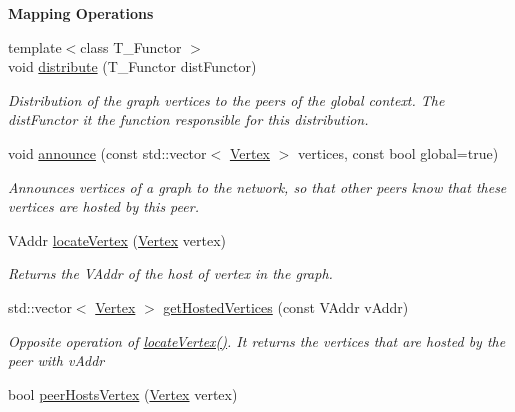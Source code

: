 \begin{Indent}{\bf Mapping Operations}\par
\begin{DoxyCompactItemize}
\item 
{\footnotesize template$<$class T\+\_\+\+Functor $>$ }\\void \hyperlink{structgraybat_1_1Cage_afeddcc035e25382462c38c77b481304d}{distribute} (T\+\_\+\+Functor dist\+Functor)
\begin{DoxyCompactList}\small\item\em Distribution of the graph vertices to the peers of the global context. The dist\+Functor it the function responsible for this distribution. \end{DoxyCompactList}\item 
void \hyperlink{structgraybat_1_1Cage_a8888227acfa41b0a9127a607ca16d32d}{announce} (const std\+::vector$<$ \hyperlink{structgraybat_1_1CommunicationVertex}{Vertex} $>$ vertices, const bool global=true)
\begin{DoxyCompactList}\small\item\em Announces {\itshape vertices} of a {\itshape graph} to the network, so that other peers know that these {\itshape vertices} are hosted by this peer. \end{DoxyCompactList}\item 
V\+Addr \hyperlink{structgraybat_1_1Cage_aefc3bddf2aa1ebbc363a35a35be8fb38}{locate\+Vertex} (\hyperlink{structgraybat_1_1CommunicationVertex}{Vertex} vertex)
\begin{DoxyCompactList}\small\item\em Returns the V\+Addr of the host of {\itshape vertex} in the graph. \end{DoxyCompactList}\item 
\hypertarget{structgraybat_1_1Cage_ad135a7bfe6929c6dfb0a4ffde2373316}{}std\+::vector$<$ \hyperlink{structgraybat_1_1CommunicationVertex}{Vertex} $>$ \hyperlink{structgraybat_1_1Cage_ad135a7bfe6929c6dfb0a4ffde2373316}{get\+Hosted\+Vertices} (const V\+Addr v\+Addr)\label{structgraybat_1_1Cage_ad135a7bfe6929c6dfb0a4ffde2373316}

\begin{DoxyCompactList}\small\item\em Opposite operation of \hyperlink{structgraybat_1_1Cage_aefc3bddf2aa1ebbc363a35a35be8fb38}{locate\+Vertex()}. It returns the vertices that are hosted by the peer with {\itshape v\+Addr} \end{DoxyCompactList}\item 
\hypertarget{structgraybat_1_1Cage_abf0aa8d61511ba1e2593fb45e694aa16}{}bool \hyperlink{structgraybat_1_1Cage_abf0aa8d61511ba1e2593fb45e694aa16}{peer\+Hosts\+Vertex} (\hyperlink{structgraybat_1_1CommunicationVertex}{Vertex} vertex)\label{structgraybat_1_1Cage_abf0aa8d61511ba1e2593fb45e694aa16}


\end{DoxyCompactItemize}
\end{Indent}
